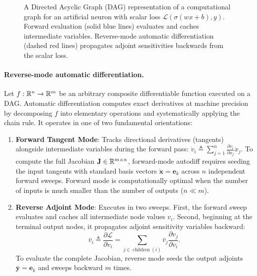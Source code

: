 \begin{figure}[H]
\caption{A Directed Acyclic Graph (DAG) representation of a computational graph for an artificial neuron with scalar loss $\mathcal{L}(\sigma(wx + b), y)$. Forward evaluation (solid blue lines) evaluates and caches intermediate variables. Reverse-mode automatic differentiation (dashed red lines) propagates adjoint sensitivities backwards from the scalar loss.}
\label{fig:computational_graph}
\end{figure}

\paragraph{Reverse-mode automatic differentiation.}
Let $f: \mathbb{R}^n \to \mathbb{R}^m$ be an arbitrary composite differentiable function executed on a DAG. Automatic differentiation computes exact derivatives at machine precision by decomposing $f$ into elementary operations and systematically applying the chain rule. It operates in one of two fundamental orientations:
\begin{enumerate}[noitemsep,topsep=2pt,parsep=0pt,partopsep=0pt]
  \item \textbf{Forward Tangent Mode}: Tracks directional derivatives (tangents) alongside intermediate variables during the forward pass: $\dot{v}_i \triangleq \sum_{j=1}^n \frac{\partial v_i}{\partial x_j} \dot{x}_j$. To compute the full Jacobian $\mathbf{J} \in \mathbb{R}^{m \times n}$, forward-mode autodiff requires seeding the input tangents with standard basis vectors $\dot{\mathbf{x}} = \mathbf{e}_k$ across $n$ independent forward sweeps. Forward mode is computationally optimal when the number of inputs is much smaller than the number of outputs ($n \ll m$).
  \item \textbf{Reverse Adjoint Mode}: Executes in two sweeps. First, the forward sweep evaluates and caches all intermediate node values $v_i$. Second, beginning at the terminal output nodes, it propagates adjoint sensitivity variables backward:
  \begin{equation}
  \bar{v}_i \triangleq \frac{\partial \mathcal{L}}{\partial v_i} = \sum_{j \in \operatorname{children}(i)} \bar{v}_j \frac{\partial v_j}{\partial v_i}.
  \label{eq:adjoint_definition}
  \end{equation}
  To evaluate the complete Jacobian, reverse mode seeds the output adjoints $\bar{\mathbf{y}} = \mathbf{e}_k$ and sweeps backward $m$ times.
\end{enumerate}


